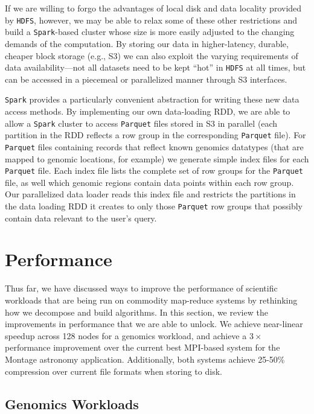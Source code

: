 \documentclass{acm_proc_article-sp}
\begin{document}
If we are willing to forgo the advantages of local disk and data locality provided by \texttt{HDFS}, however, we
may be able to relax some of these other restrictions and build a \texttt{Spark}-based cluster whose size is more
easily adjusted to the changing demands of the computation. By storing our data in higher-latency,
durable, cheaper block storage (e.g., S3) we can also exploit the varying requirements of data \linebreak
availability---not all datasets need to be kept ``hot'' in \texttt{HDFS} at all times, but can be accessed in a
piecemeal or parallelized manner through S3 interfaces.

\texttt{Spark} provides a particularly convenient abstraction for writing these new data access methods.  By
implementing our own data-loading RDD, we are able to allow a \texttt{Spark} cluster to access \texttt{Parquet} files
stored in S3 in parallel (each partition in the RDD reflects a row group in the corresponding \texttt{Parquet} file).
For \texttt{Parquet} files containing records that reflect known genomics datatypes (that are mapped to genomic
locations, for example) we generate simple index files for each \texttt{Parquet} file.  Each index file lists the
complete set of row groups for the \texttt{Parquet} file, as well which genomic regions contain data points within
each row group.  Our parallelized data loader reads this index file and restricts the partitions in the data
loading RDD it creates to only those \texttt{Parquet} row groups that possibly contain data relevant to the
user's query.

\section{Performance}
\label{sec:performance}

Thus far, we have discussed ways to improve the performance of scientific workloads that are
being run on commodity map-reduce systems by rethinking how we decompose and build algorithms.
In this section, we review the improvements in performance that we are able to unlock. We achieve
near-linear speedup across 128 nodes for a genomics workload, and achieve a $3\times$ performance
improvement over the current best MPI-based system for the Montage astronomy application.
Additionally, both systems achieve 25-50\% compression over current file formats when storing to disk.

\subsection{Genomics Workloads}
\label{sec:genomics-performance}
\end{document}
